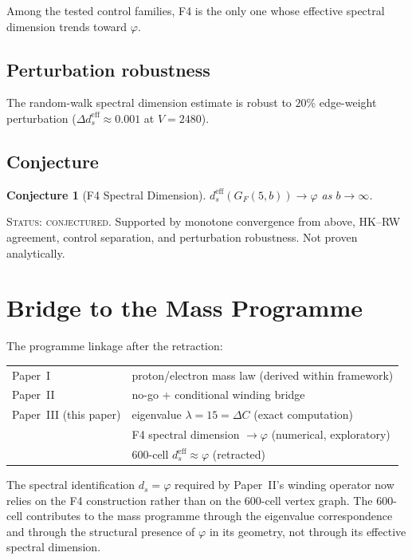 \documentclass[12pt]{article}
\newtheorem{conjecture}[theorem]{Conjecture}
\newcommand{\phig}{\varphi}
\newcommand{\ds}{d_s}
\newcommand{\dseff}{d_s^{\mathrm{eff}}}
\begin{document}
Among the tested control families, F4 is the only one whose effective spectral dimension trends toward $\phig$.

\subsection{Perturbation robustness}

The random-walk spectral dimension estimate is robust to $20\%$ edge-weight perturbation ($\Delta \dseff \approx 0.001$ at $V = 2480$).

\subsection{Conjecture}

\begin{conjecture}[F4 Spectral Dimension]\label{conj:F4}
$\dseff(G_F(5,b)) \to \phig$ as $b \to \infty$.
\end{conjecture}

\textsc{Status: conjectured.} Supported by monotone convergence from above, HK--RW agreement, control separation, and perturbation robustness. Not proven analytically.

\section{Bridge to the Mass Programme}\label{sec:bridge}

The programme linkage after the retraction:
\begin{center}
\begin{tabular}{@{}ll@{}}
Paper~I & proton/electron mass law (derived within framework) \\
Paper~II & no-go + conditional winding bridge \\
Paper~III (this paper) & eigenvalue $\lambda = 15 = \Delta C$ (exact computation) \\
 & F4 spectral dimension $\to \phig$ (numerical, exploratory) \\
 & 600-cell $\dseff \approx \phig$ (retracted) \\
\end{tabular}
\end{center}

The spectral identification $\ds = \phig$ required by Paper~II's winding operator now relies on the F4 construction rather than on the 600-cell vertex graph. The 600-cell contributes to the mass programme through the eigenvalue correspondence and through the structural presence of $\phig$ in its geometry, not through its effective spectral dimension.
\end{document}
